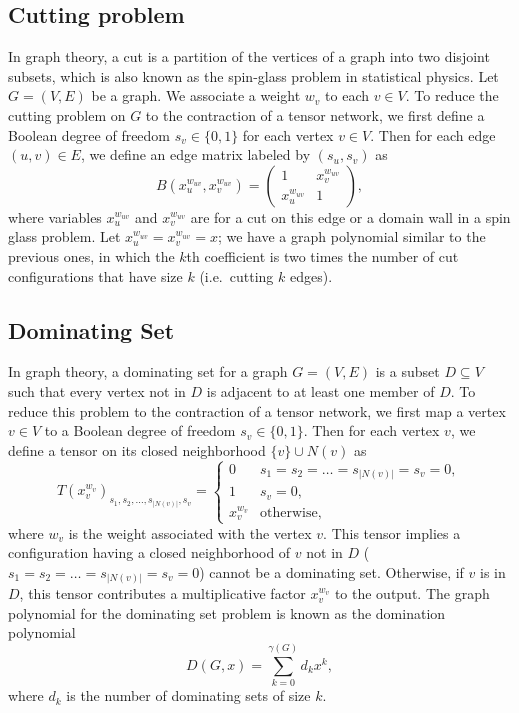 \documentclass[onefignum, onetabnum]{siamart190516}
\newcommand{\<}{\langle}
\renewcommand{\>}{\rangle}
\begin{document}
\subsection{Cutting problem}
In graph theory, a cut is a partition of the vertices of a graph into two disjoint subsets,
which is also known as the spin-glass problem in statistical physics.
Let $G=(V,E)$ be a graph. We associate a weight $w_v$ to each $v\in V$. To reduce the cutting problem on $G$ to the contraction of a tensor network, we first define a Boolean degree of freedom $s_v\in\{0, 1\}$ for each vertex $v\in V$.
Then for each edge $(u,v)\in E$, we define an edge matrix labeled by $(s_u, s_v)$ as
\begin{equation}
    B(x^{w_{uv}}_u, x^{w_{uv}}_v) = \left(\begin{matrix}
        1 & x_{v}^{w_{uv}}\\
        x_{u}^{w_{uv}} & 1
    \end{matrix}\right),
\end{equation}
where variables $x_u^{w_{uv}}$ and $x_v^{w_{uv}}$ are for a cut on this edge or a domain wall in a spin glass problem.
Let $x_u^{w_{uv}} = x_v^{w_{uv}} = x$; we have a graph polynomial similar to the previous ones,
in which the $k$th coefficient is two times the number of cut configurations that have size $k$ (i.e.\ cutting $k$ edges).

\subsection{Dominating Set}
In graph theory, a dominating set for a graph $G = (V, E)$ is a subset $D \subseteq V$ such that every vertex not in $D$ is adjacent to at least one member of $D$.
To reduce this problem to the contraction of a tensor network, we first map a vertex $v\in V$ to a Boolean degree of freedom $s_v\in\{0, 1\}$.
Then for each vertex $v$, we define a tensor on its closed neighborhood $\{v\} \cup N(v)$ as
\begin{equation}
T(x^{w_v}_v)_{s_1,s_2,\ldots,s_{|N(v)|},s_v} = \begin{cases}
    0 & s_1=s_2=\ldots=s_{|N(v)|}=s_v=0,\\
    1 & s_v=0,\\
    x^{w_v}_v & \text{otherwise},
\end{cases}
\end{equation}
where $w_v$ is the weight associated with the vertex $v$.
This tensor implies a configuration having a closed neighborhood of $v$ not in $D$ ($s_1=s_2=\ldots=s_{|N(v)|}=s_v=0$) cannot be a dominating set.
Otherwise, if $v$ is in $D$, this tensor contributes a multiplicative factor $x_v^{w_v}$ to the output.
The graph polynomial for the dominating set problem is known as the domination polynomial~\cite{Alikhani2009}
\begin{equation}
D(G, x) = \sum_{k=0}^{\gamma(G)} d_k x^k,
\end{equation}
where $d_k$ is the number of dominating sets of size $k$.
\end{document}
